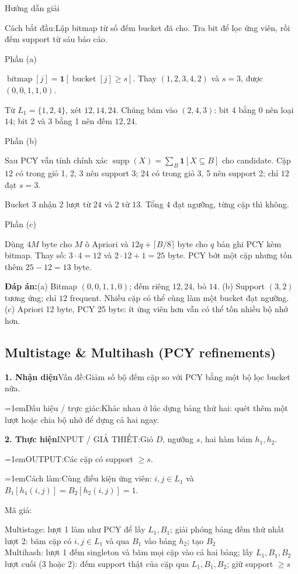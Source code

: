\documentclass[10pt,a4paper,twocolumn]{article}
\makeatletter
\newcommand{\maptag}[1]{\phantomsection\@bsphack\protected@write\@auxout{}{\string\newlabel{#1}{{}{\thepage}{}{\@currentHref}{}}}\@esphack}
\newif\ifexamheadingprinted
\newcommand{\topic}[2]{%
  \global\examheadingprintedfalse\par\subsection{#2}\label{topic:#1}}
\newcommand{\key}[1]{#1:\enspace}
\newcommand{\solutionprompt}[1]{\par\addvspace{1pt}\noindent\key{Cách bắt đầu}#1\par\addvspace{2pt}}
\newcommand{\blocklabel}[1]{\par\noindent#1\par\nobreak}
\newcommand{\answer}[1]{%
  \par\addvspace{3pt}%
  \blocklabel{#1Hướng dẫn giải}}
\newcommand{\finalanswer}[1]{%
  \par\addvspace{3pt}\noindent\textbf{Đáp án:}\nobreak\enspace#1\par}
\newcommand{\guidepart}[1]{%
  \par\addvspace{1.5pt}%
  \blocklabel{Phần #1}}
\newcommand{\algfield}[2]{\par\noindent\hangindent=1em\relax#1:\enspace#2}
\newcommand{\unitfield}[4]{%
  \par\noindent\textbf{#1. #2}\enspace #3:\enspace #4}
\newcommand{\algsummary}[6]{%
  \begingroup\setlength{\parskip}{1pt}%
  \unitfield{1}{Nhận diện}{Vấn đề}{#1}%
  \algfield{Dấu hiệu / trực giác}{#2}%
  \if\relax\detokenize{#3}\relax\else\par\noindent#3\par\fi%
  \unitfield{2}{Thực hiện}{INPUT / GIẢ THIẾT}{#4}%
  \algfield{OUTPUT}{#5}%
  \algfield{Cách làm}{#6}\par\endgroup}
\newenvironment{algpseudo}{%
  \par\addvspace{2pt}\noindent
  \setlength{\parskip}{0pt}%
  Mã giả:\par\nobreak
  \begin{list}{}{\setlength{\leftmargin}{1em}\setlength{\topsep}{0pt}%
    \setlength{\partopsep}{0pt}\setlength{\parsep}{0pt}%
    \@beginparpenalty=10000\relax}%
  \item\relax
}{\end{list}\par\addvspace{3pt}}
\makeatother
\begin{document}
\answer{\maptag{answer:Pr2}}
\solutionprompt{Lập bitmap từ số đếm bucket đã cho. Tra bit để lọc ứng viên, rồi đếm support từ sáu báo cáo.}
\guidepart{(a)}
\begin{guidesteps}
\item $\operatorname{bitmap}[j]=\mathbf1[\operatorname{bucket}[j]\ge s]$. Thay $(1,2,3,4,2)$ và $s=3$, được $(0,0,1,1,0)$.
\item Từ $L_1=\{1,2,4\}$, xét $12,14,24$. Chúng băm vào $(2,4,3)$: bit 4 bằng 0 nên loại $14$; bit 2 và 3 bằng 1 nên đếm $12,24$.
\end{guidesteps}
\guidepart{(b)}
\begin{guidesteps}
\item Sau PCY vẫn tính chính xác $\operatorname{supp}(X)=\sum_B\mathbf1[X\subseteq B]$ cho candidate. Cặp $12$ có trong giỏ 1, 2, 3 nên support 3; $24$ có trong giỏ 3, 5 nên support 2; chỉ $12$ đạt $s=3$.
\item Bucket 3 nhận 2 lượt từ $24$ và 2 từ $13$. Tổng 4 đạt ngưỡng, từng cặp thì không.
\end{guidesteps}
\guidepart{(c)}
\begin{guidesteps}
\item Dùng $4M$ byte cho $M$ ô Apriori và $12q+\lceil B/8\rceil$ byte cho $q$ bản ghi PCY kèm bitmap. Thay số: $3\cdot4=12$ và $2\cdot12+1=25$ byte. PCY bớt một cặp nhưng tốn thêm $25-12=13$ byte.
\end{guidesteps}
\finalanswer{(a) Bitmap $(0,0,1,1,0)$; đếm riêng $12,24$, bỏ $14$. (b) Support $(3,2)$ tương ứng; chỉ $12$ frequent. Nhiều cặp có thể cùng làm một bucket đạt ngưỡng. (c) Apriori 12 byte, PCY 25 byte: ít ứng viên hơn vẫn có thể tốn nhiều bộ nhớ hơn.}
\topic{multihash}{Multistage \& Multihash (PCY refinements)}

\algsummary{Giảm số bộ đếm cặp so với PCY bằng một bộ lọc bucket nữa.}{Khác nhau ở lúc dựng bảng thứ hai: quét thêm một lượt hoặc chia bộ nhớ để dựng cả hai ngay.}{}{Giỏ $D$, ngưỡng $s$, hai hàm băm $h_1,h_2$.}{Các cặp có support $\ge s$.}{Cùng điều kiện ứng viên: $i,j\in L_1$ và $B_1[h_1(i,j)]=B_2[h_2(i,j)]=1$.}

\begin{algpseudo}
Multistage: lượt 1 làm như PCY để lấy $L_1,B_1$; giải phóng bảng đếm thứ nhất\\
\quad lượt 2: băm cặp có $i,j\in L_1$ và qua $B_1$ vào bảng $h_2$; tạo $B_2$\\
Multihash: lượt 1 đếm singleton và băm mọi cặp vào cả hai bảng; lấy $L_1,B_1,B_2$\\
lượt cuối (3 hoặc 2): đếm support thật của cặp qua $L_1,B_1,B_2$; giữ support $\ge s$
\end{algpseudo}
\end{document}
